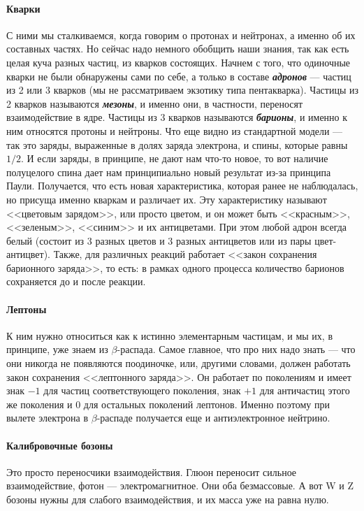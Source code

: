 \documentclass[12pt]{article}
\begin{document}
\paragraph{Кварки} 
С ними мы сталкиваемся, когда говорим о протонах и нейтронах, а именно об их составных частях. Но сейчас надо немного обобщить наши знания, так как есть целая куча разных частиц, из кварков состоящих. Начнем с того, что одиночные  кварки не были обнаружены сами по себе, а только в составе \textbf{\textit{адронов}} --- частиц из 2 или 3 кварков (мы не рассматриваем экзотику типа пентакварка). Частицы из 2 кварков называются \textit{\textbf{мезоны}}, и именно они, в частности, переносят взаимодействие в ядре. Частицы из 3 кварков называются \textit{\textbf{барионы}}, и именно к ним относятся протоны и нейтроны. Что еще видно из стандартной модели --- так это заряды, выраженные в долях заряда электрона, и спины, которые равны $1/2$. И если заряды, в принципе, не дают нам что-то новое, то вот наличие полуцелого спина дает нам принципиально новый результат из-за принципа Паули. Получается, что есть новая характеристика, которая ранее не наблюдалась, но присуща именно кваркам и различает их. Эту характеристику называют <<цветовым зарядом>>, или просто цветом, и он может быть <<красным>>, <<зеленым>>, <<синим>> и их антицветами. При этом любой адрон всегда белый (состоит из 3 разных цветов и 3 разных антицветов или из пары цвет-антицвет). Также, для различных реакций работает <<закон сохранения барионного заряда>>, то есть: в рамках одного процесса количество барионов сохраняется до и после реакции.
\paragraph{Лептоны}
К ним нужно относиться как к истинно элементарным частицам, и мы их, в принципе, уже знаем из $\beta$-распада. Самое главное, что про них надо знать --- что они никогда не появляются поодиночке, или, другими словами, должен работать закон сохранения <<лептонного заряда>>. Он работает по поколениям и имеет знак $-1$ для частиц соответствующего поколения, знак $+1$ для античастиц этого же поколения и $0$ для остальных поколений лептонов. Именно поэтому при вылете электрона в $\beta$-распаде получается еще и антиэлектронное нейтрино.
\paragraph{Калибровочные бозоны}
Это просто переносчики взаимодействия. Глюон переносит сильное взаимодействие, фотон --- электромагнитное. Они оба безмассовые. А вот W и Z бозоны нужны для слабого взаимодействия, и их масса уже на равна нулю.
\end{document}
